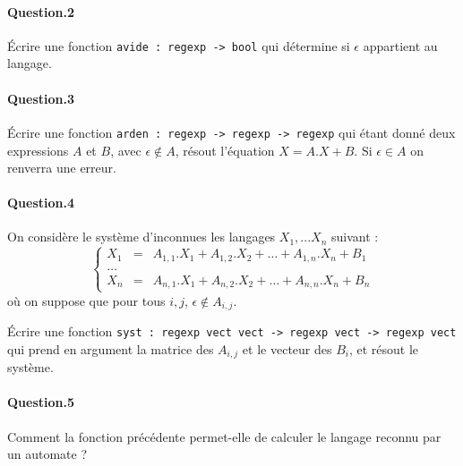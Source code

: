 \documentclass[10pt,a4paper]{article}
\theoremstyle{definition}
\begin{document}
\paragraph{Question.2} Écrire une fonction \texttt{avide : regexp -> bool} qui 
détermine si $\epsilon$ appartient au langage.

\paragraph{Question.3} Écrire une fonction \texttt{arden : regexp -> regexp -> regexp}
qui étant donné deux expressions $A$ et $B$, avec $\epsilon \notin A$, résout
l'équation $X=A.X + B$. Si $\epsilon \in A$ on renverra une erreur.

\paragraph{Question.4} On considère le système d'inconnues les langages $X_1,...X_n$
suivant :
\[\left\lbrace
\begin{array}{lcl}
X_1 &=& A_{1,1}.X_1 + A_{1,2}.X_2 + \dots + A_{1,n}.X_n + B_1\\
\dots \\
X_n &=& A_{n,1}.X_1 + A_{n,2}.X_2 + \dots + A_{n,n}.X_n + B_n
\end{array}\right.\]
où on suppose que pour tous $i,j$, $\epsilon \notin A_{i,j}$.

Écrire une fonction \texttt{syst : regexp vect vect -> regexp vect -> regexp vect}
qui prend en argument la matrice des $A_{i,j}$ et le vecteur des $B_i$, et résout
le système.

\paragraph{Question.5} Comment la fonction précédente permet-elle de calculer 
le langage reconnu par un automate ?
\end{document}
